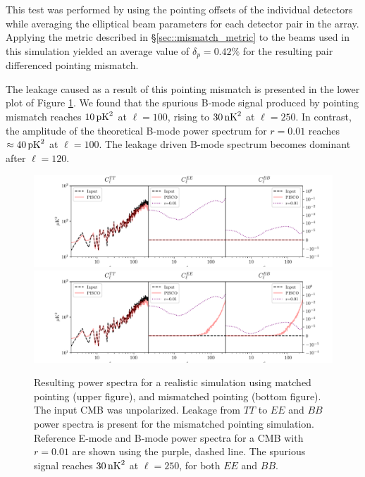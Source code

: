 \documentclass[a4paper,11pt]{article}
\begin{document}
This test was performed by using the pointing offsets of the individual detectors while averaging the elliptical beam parameters for each detector pair in the array. Applying the metric described in \S\ref{sec::mismatch_metric} to the beams used in this simulation yielded an average value of $\delta_p = 0.42\%$ for the resulting pair differenced pointing mismatch. 

The leakage caused as a result of this pointing mismatch is presented in the lower plot of Figure \ref{fig::pisco4class_pointingmismatch}. We found that the spurious B-mode signal produced by pointing mismatch reaches $10 \, \rm{pK}^2$ at $\ell=100$, rising to $30 \, \rm{nK}^2$ at $\ell=250$. In contrast, the amplitude of the theoretical B-mode power spectrum for $r=0.01$ reaches $\approx 40 \, \rm{pK}^2$ at $\ell=100$. The leakage driven B-mode spectrum becomes dominant after $\ell=120$.

\begin{figure}
    \centering
    \includegraphics[width=1\textwidth]{figures/unpol.pdf}
    \includegraphics[width=1\textwidth]{figures/pointingMismatch.pdf}
	\caption{Resulting power spectra for a realistic simulation using matched pointing (upper figure), and mismatched pointing (bottom figure). The input CMB was unpolarized. Leakage from $TT$ to $EE$ and $BB$ power spectra is present for the mismatched pointing simulation. Reference E-mode and B-mode power spectra for a CMB with $r=0.01$ are shown using the purple, dashed line. The spurious signal reaches $30\, \rm{nK}^2$ at $\ell = 250$, for both $EE$ and $BB$.}
	\label{fig::pisco4class_pointingmismatch}
\end{figure}
\end{document}
